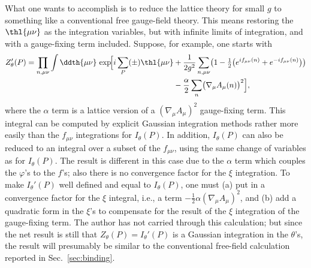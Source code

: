 What one wants to accomplish is to reduce the lattice theory for small
$g$ to something like a conventional free gauge-field theory.  This
means restoring the $\thl{\mu\nu}$ as the integration variables, but
with infinite limits of integration, and with a gauge-fixing term
included.  Suppose, for example, one starts with
\begin{equation}
\begin{split}
Z_{\theta}'(P) = \prod_{n,\mu\nu}\int\ddth{\mu\nu}\,
  \exp\!\Bigl[i\sum_{P}(\pm)\thl{\mu\nu}
    &+\frac{1}{2g^{2}}\sum_{n,\mu\nu}
      \bigl(1-\tfrac{1}{2}\bigl(e^{if_{\mu\nu}(n)}+e^{-if_{\mu\nu}(n)}\bigr)\bigr)\\
    &-\frac{\alpha}{2}\sum_{n}\bigl(\nabla_{\mu}A_{\mu}(n)\bigr)^{2}\Bigr],
\end{split}
\label{eq:5.6}
\end{equation}
where the $\alpha$ term is a lattice version of a
$(\nabla_{\mu}A_{\mu})^{2}$ gauge-fixing term.  This integral can be
computed by explicit Gaussian integration methods rather more easily
than the $f_{\mu\nu}$ integrations for $I_{\theta}(P)$.  In addition,
$I_{\theta}(P)$ can also be reduced to an integral over a subset of the
$f_{\mu\nu}$, using the same change of variables as for $I_{\theta}(P)$.
The result is different in this case due to the $\alpha$ term which
couples the $\varphi$'s to the $f$'s; also there is no convergence
factor for the $\xi$ integration.  To make $I_{\theta}'(P)$ well defined
and equal to $I_{\theta}(P)$, one must (a) put in a convergence factor
for the $\xi$ integral, i.e., a term $-\tfrac{1}{2}\alpha(\nabla_{\mu}A_{\mu})^{2}$, and
(b) add a quadratic form in the $\xi$'s to compensate for the result of
the $\xi$ integration of the gauge-fixing term.  The author has not
carried through this calculation; but since the net result is still that
$Z_{\theta}(P) = I_{\theta}'(P)$ is a Gaussian integration in the
$\theta$'s, the result will presumably be similar to the conventional
free-field calculation reported in Sec.~\ref{sec:binding}.
